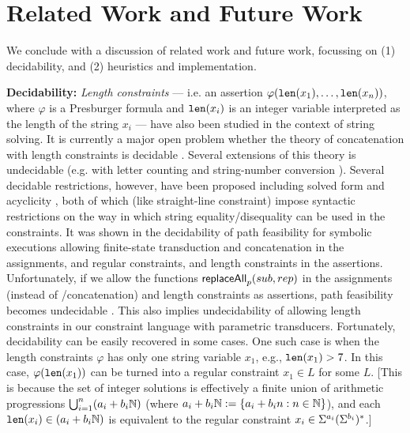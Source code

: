 \section{Related Work and Future Work}
\label{sec:related}

We conclude with a discussion of related work and future work, focussing on
(1) decidability, and (2) heuristics and implementation.

\smallskip
\noindent
\textbf{Decidability:}
\emph{Length constraints} --- i.e. an assertion 
$\varphi(\texttt{len}(x_1),\ldots,\texttt{len}(x_n))$, where $\varphi$ is a Presburger formula
and $\texttt{len}(x_i)$ is an integer variable interpreted as the length of the string
$x_i$ --- have also been studied in the context of string solving. It is
currently a major open problem whether the theory of concatenation with length
constraints is decidable \cite{Vijay-length}. Several extensions of this 
theory is undecidable (e.g. with letter counting \cite{buchi} and
string-number conversion \cite{GB16}).
Several decidable restrictions, however,
have been proposed including solved form \cite{Vijay-length} and acyclicity 
\cite{Abdulla14}, both of which (like straight-line constraint) impose 
syntactic restrictions on the way in which string equality/disequality can be
used in the constraints. It was shown in \cite{LB16} the decidability of path 
feasibility for symbolic
executions allowing finite-state transduction and concatenation in the 
assignments, and regular constraints, and length constraints 
in the assertions. Unfortunately, if we allow the functions
$\mathsf{replaceAll}_p(sub,rep)$ in the assignments (instead of
\FT{}/concatenation) and length constraints as assertions, path
feasibility becomes undecidable \cite{CCHLW18}. This also implies undecidability
of allowing length constraints in our constraint language with parametric
transducers. Fortunately, decidability can be easily recovered in some
cases. One such case is when the length constraints $\varphi$ has only
one string variable $x_1$, e.g., $\texttt{len}(x_1) > 7$. In this case,
$\varphi(\texttt{len}(x_1))$ can be turned into a regular constraint $x_1 \in L$ for
some $L$. [This is because the set of integer solutions is effectively
a finite union of arithmetic progressions $\bigcup_{i=1}^n (a_i + b_i\mathbb{N})$
(where $a_i + b_i\mathbb{N} := \{ a_i + b_in : n \in \mathbb{N}\}$), and each 
$\texttt{len}(x_i) \in (a_i + b_i\mathbb{N})$ is equivalent to the regular constraint 
$x_i \in \Sigma^{a_i} (\Sigma^{b_i})^*$.] 

